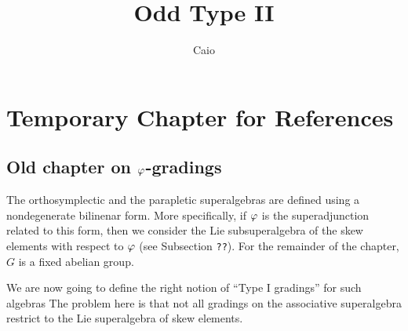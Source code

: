\documentclass{amsbook}
\begin{document}


\author[Caio]{Caio}
\address{Department of Mathematics and Statistics,
	Memorial University of Newfoundland,
St. John's, NL, A1C5S7, Canada}




\date{}

\title{Odd Type II}






\chapter{Temporary Chapter for References}
    
\section{Old chapter on $\varphi$-gradings}

The orthosymplectic and the parapletic superalgebras are defined using a nondegenerate bilinenar form. More specifically, if $\varphi$ is the superadjunction related to this form, then we consider the Lie subsuperalgebra of the skew elements with respect to $\varphi$ (see Subsection {\tt ??}). For the remainder of the chapter, $G$ is a fixed abelian group.

We are now going to define the right notion of ``Type I gradings'' for such algebras %
The problem here is that not all gradings on the associative superalgebra restrict to the Lie superalgebra of skew elements.
\end{document}
